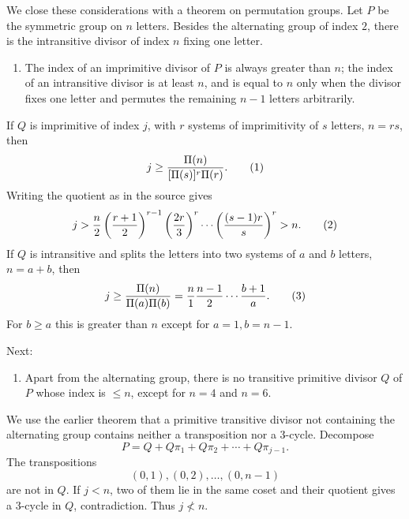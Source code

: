 \documentclass[11pt]{article}
\begin{document}
We close these considerations with a theorem on permutation groups. Let $P$ be the symmetric group on $n$ letters. Besides the alternating group of index $2$, there is the intransitive divisor of index $n$ fixing one letter.

\begin{enumerate}[label=\Roman*.,leftmargin=2.4em]
\item The index of an imprimitive divisor of $P$ is always greater than $n$; the index of an intransitive divisor is at least $n$, and is equal to $n$ only when the divisor fixes one letter and permutes the remaining $n-1$ letters arbitrarily.
\end{enumerate}
If $Q$ is imprimitive of index $j$, with $r$ systems of imprimitivity of $s$ letters, $n=rs$, then
\begin{equation}
j\ge {\Pi(n)\over [\Pi(s)]^r\Pi(r)}.
\tag{1}
\end{equation}
Writing the quotient as in the source gives
\begin{equation}
j>{n\over2}\left({r+1\over2}\right)^{r-1}\left({2r\over3}\right)^r\cdots
\left({(s-1)r\over s}\right)^r>n.
\tag{2}
\end{equation}
If $Q$ is intransitive and splits the letters into two systems of $a$ and $b$ letters, $n=a+b$, then
\begin{equation}
j\ge {\Pi(n)\over \Pi(a)\Pi(b)}={n\over1}{n-1\over2}\cdots {b+1\over a}.
\tag{3}
\end{equation}
For $b\ge a$ this is greater than $n$ except for $a=1,b=n-1$.

Next:
\begin{enumerate}[label=\Roman*.,leftmargin=2.4em,start=2]
\item Apart from the alternating group, there is no transitive primitive divisor $Q$ of $P$ whose index is $\le n$, except for $n=4$ and $n=6$.
\end{enumerate}
We use the earlier theorem that a primitive transitive divisor not containing the alternating group contains neither a transposition nor a 3-cycle. Decompose
\begin{equation}
P=Q+Q\pi_1+Q\pi_2+\cdots+Q\pi_{j-1}.
\tag{4}
\end{equation}
The transpositions
\begin{equation}
(0,1),(0,2),\ldots,(0,n-1)
\tag{5}
\end{equation}
are not in $Q$. If $j<n$, two of them lie in the same coset and their quotient gives a 3-cycle in $Q$, contradiction. Thus $j\not<n$.
\end{document}
